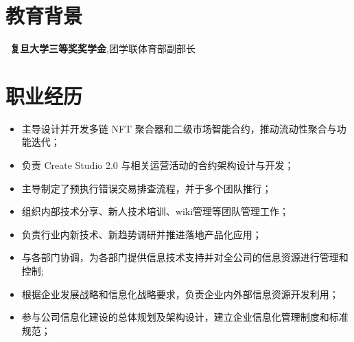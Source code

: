 \documentclass{resume}
\begin{document}




\section{教育背景}
\ \textbf{复旦大学三等奖奖学金},团学联体育部副部长

\section{职业经历}

\begin{itemize}[parsep=0.5ex]
  \item 主导设计并开发多链 NFT 聚合器和二级市场智能合约，推动流动性聚合与功能迭代；
  \item 负责 Create Studio 2.0 与相关运营活动的合约架构设计与开发；
  \item 主导制定了预执行错误交易排查流程，并于多个团队推行；
  \item 组织内部技术分享、新人技术培训、wiki管理等团队管理工作；
  \item 负责行业内新技术、新趋势调研并推进落地产品化应用；
\end{itemize}

\begin{itemize}[parsep=0.5ex]
  \item 与各部门协调，为各部门提供信息技术支持并对全公司的信息资源进行管理和控制;
  \item 根据企业发展战略和信息化战略要求，负责企业内外部信息资源开发利用；
  \item 参与公司信息化建设的总体规划及架构设计，建立企业信息化管理制度和标准规范；
\end{itemize}
\end{document}
